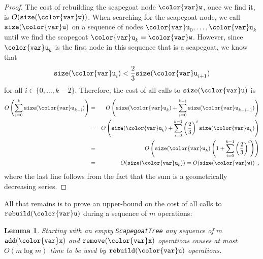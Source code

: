 \documentclass[10pt]{book}
\theoremstyle{plain}
\newtheorem{lem}{Lemma}[chapter]
\newcommand{\lemlabel}[1]{\label{lem:#1}}
\theoremstyle{definition}
\begin{document}
\begin{proof}
The cost of rebuilding the scapegoat node \ensuremath{\mathtt{{\color{var}w}}}, once we find it, is
$O(\ensuremath{\mathtt{size({\color{var}w})}})$.  When searching for the scapegoat node, we call \ensuremath{\mathtt{size({\color{var}u})}}
on a sequence of nodes $\ensuremath{\mathtt{{\color{var}u}}}_0,\ldots,\ensuremath{\mathtt{{\color{var}u}}}_k$ until we find the scapegoat
$\ensuremath{\mathtt{{\color{var}u}}}_k=\ensuremath{\mathtt{{\color{var}w}}}$.  However, since $\ensuremath{\mathtt{{\color{var}u}}}_k$ is the first node in this sequence
that is a scapegoat, we know that
\[
  \ensuremath{\mathtt{size({\color{var}u}}}_{i}\ensuremath{\mathtt{)}} < \frac{2}{3}\ensuremath{\mathtt{size({\color{var}u}}}_{i+1}\ensuremath{\mathtt{)}}
\]
for all $i\in\{0,\ldots,k-2\}$.  Therefore, the cost of all calls to \ensuremath{\mathtt{size({\color{var}u})}} is
\begin{eqnarray*}
 O\left( \sum_{i=0}^k \ensuremath{\mathtt{size({\color{var}u}}}_{k-i}\ensuremath{\mathtt{)}} \right)
 &=& O\left(
  \ensuremath{\mathtt{size({\color{var}u}}}_k\ensuremath{\mathtt{)}} 
  + \sum_{i=0}^{k-1} \ensuremath{\mathtt{size({\color{var}u}}}_{k-i-1}\ensuremath{\mathtt{)}}
  \right) \\
 &=& O\left(
  \ensuremath{\mathtt{size({\color{var}u}}}_k\ensuremath{\mathtt{)}} 
  + \sum_{i=0}^{k-1} \left(\frac{2}{3}\right)^i\ensuremath{\mathtt{size({\color{var}u}}}_{k}\ensuremath{\mathtt{)}}
  \right) \\
&=& O\left(
  \ensuremath{\mathtt{size({\color{var}u}}}_k\ensuremath{\mathtt{)}}\left(1+ 
   \sum_{i=0}^{k-1} \left(\frac{2}{3}\right)^i
  \right)\right) \\
&=& O(\ensuremath{\mathtt{size({\color{var}u}}}_k\ensuremath{\mathtt{)}}) = O(\ensuremath{\mathtt{size({\color{var}w})}}) \enspace ,
\end{eqnarray*}
where the last line follows from the fact that the sum is a geometrically decreasing series.
\end{proof}

All that remains is to prove an upper-bound on the cost of all calls to
\ensuremath{\mathtt{rebuild({\color{var}u})}} during a sequence of $m$ operations:

\begin{lem}\lemlabel{scapegoat-amortized}
  Starting with an empty \texttt{ScapegoatTree} any sequence of $m$ \ensuremath{\mathtt{add({\color{var}x})}}
  and \ensuremath{\mathtt{remove({\color{var}x})}} operations causes at most $O(m\log m)$ time to be used
  by \ensuremath{\mathtt{rebuild({\color{var}u})}} operations.
\end{lem}
\end{document}
